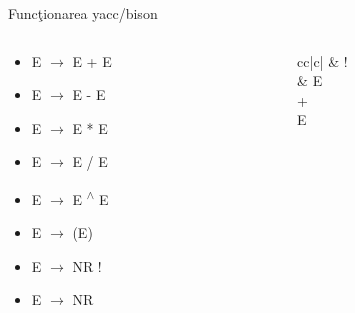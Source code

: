 \documentclass[pdf]{beamer}
\begin{document}
\begin{frame}{Funcţionarea yacc/bison}
\begin{columns}
\begin{column}{0.5\textwidth}
\begin{itemize}
	\item
	E $\rightarrow$ E + E

	\item
	E $\rightarrow$ E - E

	\item
	E $\rightarrow$ E * E

	\item
	E $\rightarrow$ E / E

	\item
	E $\rightarrow$ E \textsuperscript{$\wedge$} E

	\item
	E $\rightarrow$ (E)

	\item
	E $\rightarrow$ NR !

	\item
	E $\rightarrow$ NR

\end{itemize}
\end{column}

\begin{column}{0.3\textwidth}
\begin{tabular}{cc|c|} 
 & {\hspace{0.4cm} !} \\ 
 &   
 {E} \\
 {+} \\
 {E} \\ 
\end{tabular}

\end{column}
\end{columns}
\end{frame}
\end{document}
